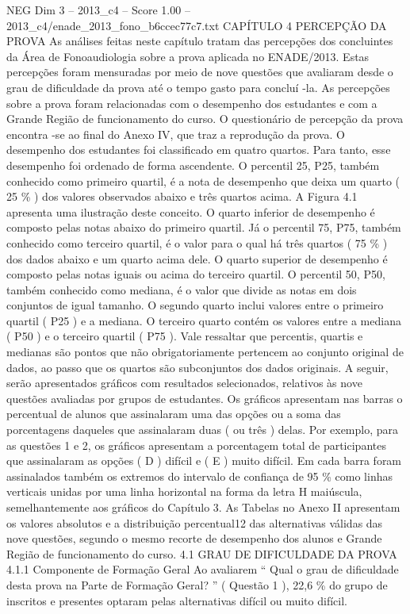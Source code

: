 \begin{textsample}{NEG Dim 3 – 2013\_c4 – Score 1.00 – 2013\_c4/enade\_2013\_fono\_b6ccec77c7.txt}  \label{ex:f3_neg_135}
CAPÍTULO 4 PERCEPÇÃO DA PROVA As análises feitas neste capítulo tratam das percepções dos concluintes da Área de Fonoaudiologia sobre a prova aplicada no ENADE/2013.
Estas percepções foram mensuradas por meio de nove questões que avaliaram desde o grau de dificuldade da prova até o tempo gasto para concluí -la.
As percepções sobre a prova foram relacionadas com o desempenho dos estudantes e com a Grande Região de funcionamento do curso.
O questionário de percepção da prova encontra -se ao final do Anexo IV, que traz a reprodução da prova.
O desempenho dos estudantes foi classificado em quatro quartos.
Para tanto, esse desempenho foi ordenado de forma ascendente.
O percentil 25, P25, também conhecido como primeiro quartil, é a nota de desempenho que deixa um quarto ( 25 \% ) dos valores observados abaixo e três quartos acima.
A Figura 4.1 apresenta uma ilustração deste conceito.
O quarto inferior de desempenho é composto pelas notas abaixo do primeiro quartil.
Já o percentil 75, P75, também conhecido como terceiro quartil, é o valor para o qual há três quartos ( 75 \% ) dos dados abaixo e um quarto acima dele.
O quarto superior de desempenho é composto pelas notas iguais ou acima do terceiro quartil.
O percentil 50, P50, também conhecido como mediana, é o valor que divide as notas em dois conjuntos de igual tamanho.
O segundo quarto inclui valores entre o primeiro quartil ( P25 ) e a mediana.
O terceiro quarto contém os valores entre a mediana ( P50 ) e o terceiro quartil ( P75 ).
Vale ressaltar que percentis, quartis e medianas são pontos que não obrigatoriamente pertencem ao conjunto original de dados, ao passo que os quartos são subconjuntos dos dados originais.
A seguir, serão apresentados gráficos com resultados selecionados, relativos às nove questões avaliadas por grupos de estudantes.
Os gráficos apresentam nas barras o percentual de alunos que assinalaram uma das opções ou a soma das porcentagens daqueles que assinalaram duas ( ou três ) delas.
Por exemplo, para as questões 1 e 2, os gráficos apresentam a porcentagem total de participantes que assinalaram as opções ( D ) difícil e ( E ) muito difícil.
Em cada barra foram assinalados também os extremos do intervalo de confiança de 95 \% como linhas verticais unidas por uma linha horizontal na forma da letra H maiúscula, semelhantemente aos gráficos do Capítulo 3.
As Tabelas no Anexo II apresentam os valores absolutos e a distribuição percentual12 das alternativas válidas das nove questões, segundo o mesmo recorte de desempenho dos alunos e Grande Região de funcionamento do curso. 4.1 GRAU DE DIFICULDADE DA PROVA 4.1.1 Componente de Formação Geral Ao avaliarem “ Qual o grau de dificuldade desta prova na Parte de Formação Geral? ” ( Questão 1 ), 22,6 \% do grupo de inscritos e presentes optaram pelas alternativas difícil ou muito difícil.

\end{textsample}
